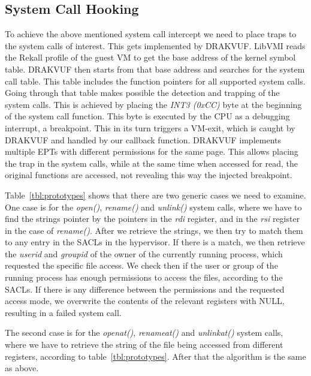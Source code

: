 \subsection{System Call Hooking}\label{sub:hooking}

To achieve the above mentioned system call intercept we need to place traps to the system calls of interest. This gets implemented by DRAKVUF. LibVMI reads the Rekall profile of the guest \ac{VM} to get the base address of the kernel symbol table. DRAKVUF then starts from that base address and searches for the system call table. This table includes the function pointers for all supported system calls. Going through that table makes possible the detection and trapping of the system calls. This is achieved by placing the \textit{INT3 (0xCC)} byte at the beginning of the system call function. This byte is executed by the \ac{CPU} as a debugging interrupt, a breakpoint. This in its turn triggers a VM-exit, which is caught by DRAKVUF and handled by our callback function. DRAKVUF implements multiple \ac{EPT}s with different permissions for the same page. This allows placing the trap in the system calls, while at the same time when accessed for read, the original functions are accessed, not revealing this way the injected breakpoint.

\par Table~\ref{tbl:prototypes} shows that there are two generic cases we need to examine. One case is for the \emph{open()}, \emph{rename()} and \emph{unlink()} system calls, where we have to find the strings pointer by the pointers in the \emph{rdi} register, and in the \emph{rsi} register in the case of \emph{rename()}. After we retrieve the strings, we then try to match them to any entry in the \ac{SACL}s in the hypervisor. If there is a match, we then retrieve the \emph{userid} and \emph{groupid} of the owner of the currently running process, which requested the specific file access. We check then if the user or group of the running process has enough permissions to access the files, according to the \ac{SACL}s. If there is any difference between the permissions and the requested access mode, we overwrite the contents of the relevant registers with NULL, resulting in a failed system call.

\par The second case is for the \emph{openat()}, \emph{renameat()} and \emph{unlinkat()} system calls, where we have to retrieve the string of the file being accessed from different registers, according to table~\ref{tbl:prototypes}. After that the algorithm is the same as above.



